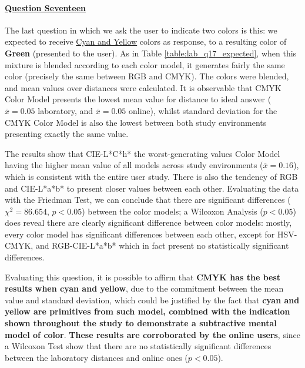 \paragraph{\ul{Question Seventeen}}
%
The last question in which we ask the user to indicate two colors is this: we expected to receive \ul{Cyan and Yellow} colors as response, to a resulting color of \textbf{Green}
(presented to the user). As in Table \ref{table:lab_q17_expected}, when this mixture is blended according to each color model, it generates fairly the same color (precisely the same between
RGB and CMYK).
The colors were blended, and mean values over distances were calculated. It is observable that CMYK Color Model presents the lowest mean value for distance to ideal answer ($\overline{x} = 0.05$
laboratory, and $\overline{x} = 0.05$ online), whilst standard deviation for the CMYK Color Model is also the lowest between both study environments presenting exactly the same value. \par
%
The results show that CIE-L*C*h* the worst-generating values Color Model having the higher mean value of all models across study environments ($\overline{x} = 0.16$), which is consistent with the
entire user study. There is also the tendency of RGB and CIE-L*a*b* to present closer values between each other. Evaluating the data with the Friedman Test, we can conclude that there are significant
differences ($\chi^2 = 86.654$, $p < 0.05$) between the color models; a Wilcoxon Analysis ($p < 0.05$) does reveal there are clearly significant difference between color models: mostly, every color model
has significant differences between each other, except for HSV-CMYK, and RGB-CIE-L*a*b* which in fact present no statistically significant differences. \par
%
Evaluating this question, it is possible to affirm that \textbf{CMYK has the best results when cyan and yellow}, due to the commitment between the mean value and standard deviation, which
could be justified by the fact that \textbf{cyan and yellow are primitives from such model, combined with the indication shown throughout the study to demonstrate a subtractive mental model of color}.
\textbf{These results are corroborated by the online users}, since a Wilcoxon Test show that there are no statistically significant differences between the laboratory distances and online ones ($p < 0.05$).
%
